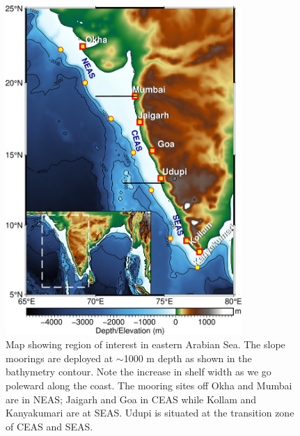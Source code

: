 \documentclass[authoryear,review,12pt]{elsarticle}
\begin{document}
\newpage
\begin{figure}[htbp]
	\centering
	\includegraphics[width=0.8\textwidth]{./figures/adcp_moorings_new1.jpeg} 
	\captionsetup{justification=justified,font=footnotesize,skip=0.05\baselineskip,width=0.8\textwidth}
	\caption{Map showing region of interest in eastern Arabian Sea. The slope moorings are
		deployed at $\sim$1000 m depth as shown in the bathymetry contour. Note the increase in shelf width as we go poleward along the coast. The mooring sites off Okha and Mumbai are in NEAS; Jaigarh and Goa in CEAS while Kollam and Kanyakumari are at SEAS. Udupi is situated at the transition zone of CEAS and SEAS.}
	\label{fig:map}
\end{figure}
\end{document}
